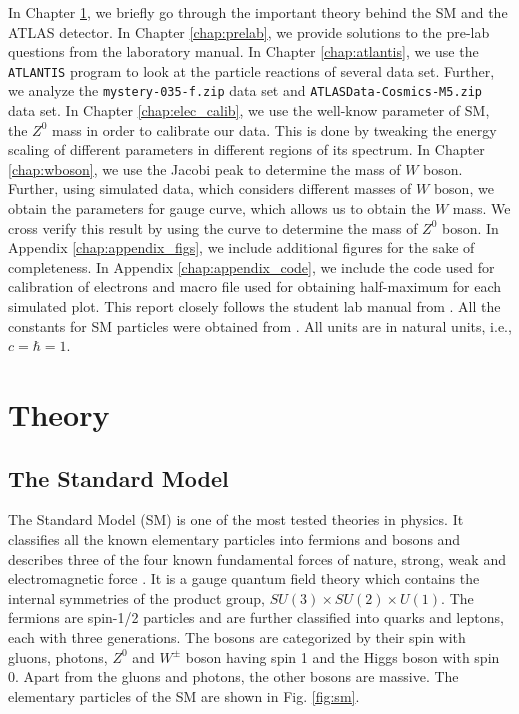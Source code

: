 \documentclass[a4paper]{report}
\numberwithin{equation}{section}
\begin{document}
In Chapter \ref{chap:theory}, we briefly go through the important theory behind the SM and the ATLAS detector. In Chapter \ref{chap:prelab}, we provide solutions to the pre-lab questions from the laboratory manual. In Chapter \ref{chap:atlantis}, we use the \texttt{ATLANTIS} program to look at the particle reactions of several data set. Further, we analyze the \texttt{mystery-035-f.zip} data set and \texttt{ATLASData-Cosmics-M5.zip} data set. In Chapter \ref{chap:elec_calib}, we use the well-know parameter of SM, the $Z^0$ mass in order to calibrate our data. This is done by tweaking the energy scaling of different parameters in different regions of its spectrum. In Chapter \ref{chap:wboson}, we use the Jacobi peak to determine the mass of $W$ boson. Further, using simulated data, which considers different masses of $W$ boson, we obtain the parameters for gauge curve, which allows us to obtain the $W$ mass. We cross verify this result by using the curve to determine the mass of $Z^0$ boson. In Appendix \ref{chap:appendix_figs}, we include additional figures for the sake of completeness. In Appendix \ref{chap:appendix_code}, we include the code used for calibration of electrons and macro file used for obtaining half-maximum for each simulated plot. This report closely follows the student lab manual from \cite{labman}. All the constants for SM particles were obtained from \cite{ParticleDataGroup:2020ssz}. All units are in natural units, i.e., $c = \hbar = 1$. 

\chapter{Theory} \label{chap:theory}

\section{The Standard Model}
The Standard Model (SM) is one of the most tested theories in physics. It classifies all the known elementary particles into fermions and bosons and describes three of the four known fundamental forces of nature, strong, weak and electromagnetic force \cite{ParticleDataGroup:2020ssz}. It is a gauge quantum field theory which contains the internal symmetries of the product group, $SU(3) \times SU(2) \times U(1)$. The fermions are spin-1/2 particles and are further classified into quarks and leptons, each with three generations. The bosons are categorized by their spin with gluons, photons, $Z^0$ and $W^{\pm}$ boson having spin 1 and the Higgs boson with spin 0. Apart from the gluons and photons, the other bosons are massive. The elementary particles of the SM are shown in Fig. \ref{fig:sm}.
\end{document}
